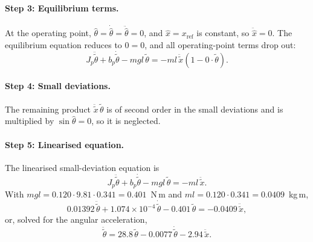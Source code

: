 \documentclass[11pt,a4paper]{article}
\begin{document}
\paragraph{Step 3: Equilibrium terms.}
At the operating point, $\hat{\theta} = \dot{\hat{\theta}} = \ddot{\hat{\theta}} = 0$, and $\hat{x} = x_\text{ref}$ is constant, so $\ddot{\hat{x}} = 0$.
The equilibrium equation reduces to $0 = 0$, and all operating-point terms drop out:
\begin{equation*}
J_p\ddot{\tilde{\theta}} + b_p\dot{\tilde{\theta}} - mgl\,\tilde{\theta}
= -ml\,\ddot{\tilde{x}}\left(1 - 0\cdot\tilde{\theta}\right).
\end{equation*}

\paragraph{Step 4: Small deviations.}
The remaining product $\ddot{\tilde{x}}\,\tilde{\theta}$ is of second order in the small deviations and is multiplied by $\sin\hat{\theta} = 0$, so it is neglected.

\paragraph{Step 5: Linearised equation.}
The linearised small-deviation equation is
\begin{equation}
J_p\ddot{\tilde{\theta}} + b_p\dot{\tilde{\theta}} - mgl\,\tilde{\theta} = -ml\,\ddot{\tilde{x}}.
\label{eq:linearised}
\end{equation}
With $mgl = 0.120 \cdot 9.81 \cdot 0.341 = 0.401$~N\,m and $ml = 0.120 \cdot 0.341 = 0.0409$~kg\,m,
\begin{equation*}
0.01392\,\ddot{\tilde{\theta}} + 1.074\times10^{-4}\,\dot{\tilde{\theta}} - 0.401\,\tilde{\theta} = -0.0409\,\ddot{\tilde{x}},
\end{equation*}
or, solved for the angular acceleration,
\begin{equation*}
\ddot{\tilde{\theta}} = 28.8\,\tilde{\theta} - 0.0077\,\dot{\tilde{\theta}} - 2.94\,\ddot{\tilde{x}}.
\end{equation*}
\end{document}
